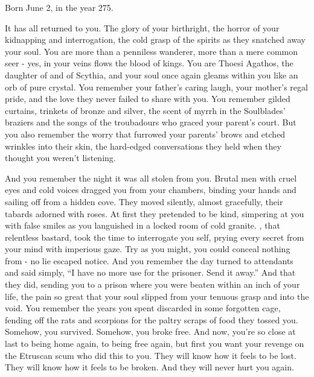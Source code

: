 \documentclass[blue]{Kos}
\begin{document}
\name{\bThoesi{}}

Born June 2, in the year 275.

It has all returned to you. The glory of your birthright, the horror of your kidnapping and interrogation, the cold grasp of the spirits as they snatched away your soul. You are more than a penniless wanderer, more than a mere common seer - yes, in your veins flows the blood of kings. You are Thoesi Agathos, the daughter of \cScythiaKing{\Monarch} \cScythiaKing{} and \cScythiaQueen{\Monarch} \cScythiaQueen{} of Scythia, and your soul once again gleams within you like an orb of pure crystal. You remember your father's caring laugh, your mother's regal pride, and the love they never failed to share with you. You remember gilded curtains, trinkets of bronze and silver, the scent of myrrh in the Soulblades' braziers and the songs of the troubadours who graced your parent's court. But you also remember the worry that furrowed your parents' brows and etched wrinkles into their skin, the hard-edged conversations they held when they thought you weren't listening. 

And you remember the night it was all stolen from you. Brutal men with cruel eyes and cold voices dragged you from your chambers, binding your hands and sailing off from a hidden cove. They moved silently, almost gracefully, their tabards adorned with roses. At first they pretended to be kind, simpering at you with false smiles as you languished in a locked room of cold granite. \cEtruriaKing{\Monarch} \cEtruriaKing{}, that relentless bastard, took the time to interrogate you \cEtruriaKing{\them}self, prying every secret from your mind with \cEtruriaKing{\their} imperious gaze. Try as you might, you could conceal nothing from \cEtruriaKing{\them} - no lie escaped \cEtruriaKing{\their} notice. And you remember the day \cEtruriaKing{\they} turned to \cEtruriaKing{\their} attendants and said simply, ``I have no more use for the prisoner. Send it away.'' And that they did, sending you to a prison where you were beaten within an inch of your life, the pain so great that your soul slipped from your tenuous grasp and into the void. You remember the years you spent discarded in some forgotten cage, fending off the rats and scorpions for the paltry scraps of food they tossed you. Somehow, you survived. Somehow, you broke free. And now, you're so close at last to being home again, to being free again, but first you want your revenge on the Etruscan scum who did this to you. They will know how it feels to be lost. They will know how it feels to be broken. And they will never hurt you again.
\end{document}
